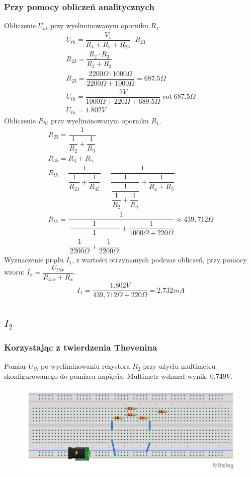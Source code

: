 \documentclass[polish,polish,a4paper]{article}
\begin{document}
\begin{spacing}{2}
	\subsubsection{Przy pomocy obliczeń analitycznych}
	Obliczenie $U_{ht}$ przy wyeliminowanym oporniku $ R_{1} $.
	\begin{gather*}
	U_{th}= \dfrac{V_{1}}{R_{4}+R_{5}+R_{23}} \cdot R_{23}\\
	R_{23} = \dfrac{R_{2} \cdot R_{3}}{R_{2} + R_{3}}\\
	R_{23} = \dfrac{2200\Omega \cdot 1000\Omega}{2200\Omega + 1000\Omega} = 687.5\Omega\\
	U_{th} = \dfrac{5V}{1000\Omega + 220\Omega + 689.5\Omega } \cot 687.5\Omega\\
	U_{th} = 1.802V
	\end{gather*}
	Obliczenie $R_{ht}$ przy wyeliminowanym oporniku $ R_{1} $.
	\begin{gather*}
		R_{23} = \dfrac{1}{\dfrac{1}{R_{2}} + \dfrac{1}{R_{3}}}\\
		R_{45} = R_{4} + R_{5}\\
		R_{th} = \dfrac{1}{\dfrac{1}{R_{23}} + \dfrac{1}{R_{45}}} = \dfrac{1}{\dfrac{1}{\dfrac{1}{\dfrac{1}{R_{2}} + \dfrac{1}{R_{3}}}} + \dfrac{1}{R_{4} + R_{5}}}\\
			R_{th} = \dfrac{1}{\dfrac{1}{\dfrac{1}{\dfrac{1}{2200\Omega} + \dfrac{1}{2200\Omega}}} + \dfrac{1}{1000\Omega + 220\Omega}} \approx 439,712\Omega
	\end{gather*}
	Wyznaczenie prądu $I_{1}$, z wartości otrzymanych podczas obliczeń, przy pomocy wzoru: $I_{x}= \dfrac{U_{thx}}{R_{thx} + R_{x}}$.
	\begin{gather*}
	I_{1}=\dfrac{1.802V}{439,712\Omega + 220\Omega } = 2.732mA
	\end{gather*}
	\subsection{$I_{2}$}
		\subsubsection{Korzystając z twierdzenia Thevenina}
			Pomiar $U_{th}$ po wyeliminowaniu rezystora $R_{2}$ przy  użyciu multimetru skonfigurowanego do pomiaru napięcia. Multimetr wskazał wynik: $0.749V$.
		\begin{figure}[H]
			\centering
			\includegraphics[scale=0.8]{R2_pomiar_napiecia_bb.pdf}
		\end{figure}
		

\end{spacing}
\end{document}
